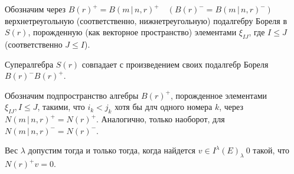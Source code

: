 
Обозначим через $ B(r)^+ = B(m\,|\,n, r)^+ \quad (B(r)^- = B(m\,|\,n, r)^-) $ верхнетреугольную (соответственно, нижнетреугольную) 
подалгебру Бореля в $ S(r) $, порожденную (как векторное пространство) элементами $ \xi_{IJ} $, где $ I \leq J$ (соответственно $ J \leq I$). 
\begin{theorem}
Супералгебра $ S(r) $ совпадает с произведением своих подалгебр Бореля $ B(r)^- B(r)^+ $. 
\end{theorem}
Обозначим подпространство алгебры $ B(r)^+ $, порожденное элементами $ \xi_{IJ}, I \leq J $, 
такими, что $ i_k < j_k $ хотя бы длч одного номера $k$, через $ N(m\,|\,n, r)^+ = N(r)^+$. 
Аналогично, только наоборот, для $ N(m\,|\,n, r)^- = N(r)^- $.

\begin{theorem}
Вес $\lambda$ допустим тогда и только тогда, когда найдется $ v \in I^{\lambda}(E)_{\lambda} \ 0 $ такой, что $ N(r)^+ v = 0 $.
\end{theorem}
